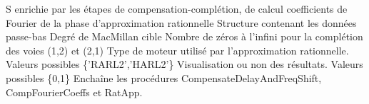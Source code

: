 %
%
%
%
%
%
%
%
{\fitem[S] S enrichie par les \'etapes de compensation-compl\'etion,
  de calcul coefficients de Fourier de la phase d'approximation rationnelle}
{\fitem[S] Structure contenant les donn\'ees passe-bas 
\fitem[n] Degr\'e de MacMillan cible
\fitem[zeros\_at\_inf=DVC.AS.zeros\_at\_inf] Nombre de z\'eros \`a l'infini pour la compl\'etion
des voies (1,2) et (2,1)
\fitem[solver\_flag=DVC.AS.solver\_flag] Type de moteur utilis\'e par l'approximation
rationnelle. Valeurs possibles \{'RARL2','HARL2'\}
\fitem[plot\_flag=DVC.AS.plot\_flag] Visualisation ou non des r\'esultats. Valeurs
possibles \{0,1\}}
{}%
{Encha\^ine les proc\'edures CompensateDelayAndFreqShift,
  CompFourierCoeffs et RatApp.}
